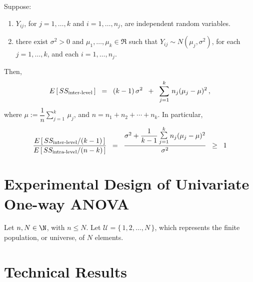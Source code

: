 \documentclass{article}
\begin{document}
\begin{lemma}
\mbox{}\vskip 0.15cm\noindent
Suppose:
\begin{enumerate}
\item  $Y_{ij}$, for $j = 1, \ldots, k$ and $i = 1, \ldots, n_{j}$, are independent random variables.
\item  there exist $\sigma^{2} > 0$ and $\mu_{1}, \ldots, \mu_{k} \in \Re$ such that $Y_{ij} \sim N(\mu_{j},\sigma^{2})$, for each $j = 1, \ldots, k$, and each $i = 1, \ldots, n_{j}$.
\end{enumerate}
Then,
\begin{equation*}
E\left[\,SS_{\textnormal{inter-level}}\,\right]
\;\; = \;\;
(k-1)\,\sigma^{2} \;\; + \;\; \sum^{k}_{j=1}\,n_{j}(\mu_{j}-\mu)^{2}\,,
\end{equation*}
where $\mu := \dfrac{1}{n}\sum^{k}_{j=1}\,\mu_{j}$, and $n = n_{1} + n_{2} + \cdots + n_{k}$.  In particular,
\begin{equation*}
\dfrac{E\left[\,SS_{\textnormal{inter-level}}/(k-1)\,\right]}{E\left[\,SS_{\textnormal{intra-level}}/(n-k)\,\right]}
\;\; = \;\;
\dfrac{\sigma^{2}+\dfrac{1}{k-1}\,\underset{j=1}{\overset{k}{\textnormal{\Large$\sum$}}}\,n_{j}(\mu_{j}-\mu)^{2}}{\sigma^{2}}
\;\; \geq \;\; 1
\end{equation*}
\end{lemma}


\section{Experimental Design of Univariate One-way ANOVA}
\setcounter{theorem}{0}

Let $n, N \in \N$, with $n \leq N$.  Let $\mathcal{U} = \{\,1,2,\ldots,N\,\}$, which represents the finite population, or universe, of $N$ elements.  


\appendix


\section{Technical Results}
\setcounter{theorem}{0}
\end{document}
